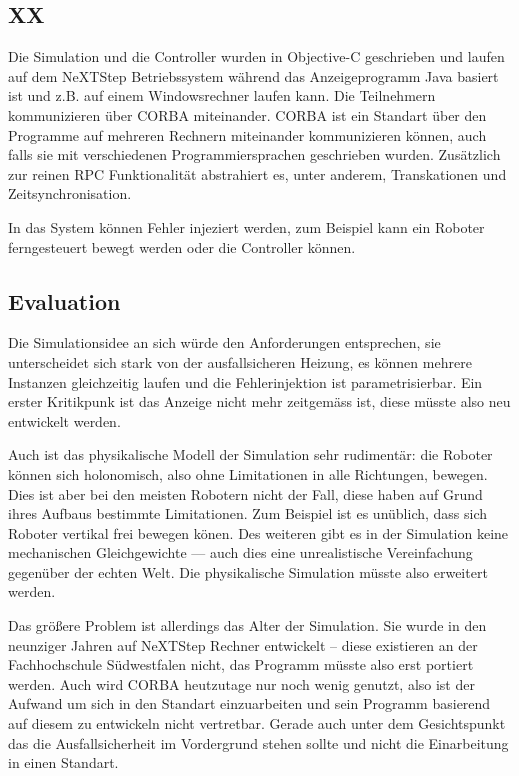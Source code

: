 \subsection{XX}
Die Simulation und die Controller wurden in Objective-C geschrieben und laufen auf dem NeXTStep Betriebssystem w{\"{a}}hrend das Anzeigeprogramm Java basiert ist und z.B. auf
einem Windowsrechner laufen kann. Die Teilnehmern kommunizieren {\"{u}}ber CORBA miteinander\cite{predictablecorba}. CORBA ist ein Standart {\"{u}}ber den Programme auf
mehreren Rechnern miteinander kommunizieren k{\"{o}}nnen, auch falls sie mit verschiedenen Programmiersprachen geschrieben wurden. Zus{\"{a}}tzlich zur reinen RPC
Funktionalit{\"{a}}t abstrahiert es, unter anderem, Transkationen und Zeitsynchronisation.

In das System k{\"{o}}nnen Fehler injeziert werden, zum Beispiel kann ein Roboter ferngesteuert bewegt werden oder die Controller k{\"{o}}nnen. \todo{}

\subsection{Evaluation} 
Die Simulationsidee an sich w{\"{u}}rde den Anforderungen entsprechen, sie unterscheidet sich stark von der ausfallsicheren Heizung, es k{\"{o}}nnen mehrere Instanzen
gleichzeitig laufen und die Fehlerinjektion ist parametrisierbar. Ein erster Kritikpunk ist das Anzeige nicht mehr zeitgem{\"{a}}ss ist, diese m{\"{u}}sste also neu
entwickelt werden.

Auch ist das physikalische Modell der Simulation sehr rudiment{\"{a}}r: die Roboter k{\"{o}}nnen sich holonomisch, also ohne Limitationen in alle Richtungen,
bewegen. Dies ist aber bei den meisten Robotern nicht der Fall, diese haben auf Grund ihres Aufbaus bestimmte Limitationen. Zum Beispiel ist es un{\"{u}}blich, dass sich
Roboter vertikal frei bewegen k{\"{o}}nen. Des weiteren gibt es in der Simulation keine mechanischen Gleichgewichte --- auch dies eine unrealistische
Vereinfachung gegen{\"{u}}ber der echten Welt. Die physikalische Simulation m{\"{u}}sste also erweitert werden.

Das gr{\"{o}}{\ss}ere Problem ist allerdings das Alter der Simulation. Sie wurde in den neunziger Jahren auf NeXTStep Rechner entwickelt -- diese existieren an der
Fachhochschule S{\"{u}}dwestfalen nicht, das Programm m{\"{u}}sste also erst portiert werden. Auch wird CORBA heutzutage nur noch wenig genutzt, also ist der Aufwand
um sich in den Standart einzuarbeiten und sein Programm basierend auf diesem zu entwickeln nicht vertretbar. Gerade auch unter dem Gesichtspunkt das die Ausfallsicherheit
im Vordergrund stehen sollte und nicht die Einarbeitung in einen Standart.

